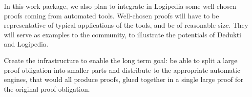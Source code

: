 \begin{workpackage}[id=atpetc,wphases=0-48,type=RTD,
  short=ATPs etc.,%
  title={ATP, SAT, SMT, Model checkers},
  lead=ULi,
  ULiRM=10]
\begin{wpdescription}
In this work package, we also plan to integrate in Logipedia some
well-chosen proofs coming from automated tools.  Well-chosen proofs
will have to be representative of typical applications of the tools,
and be of reasonable size.  They will serve as examples to the
community, to illustrate the potentials of Dedukti and Logipedia.


Create the infrastructure to enable the long term goal: be able to split a large proof
obligation into smaller parts and distribute to the appropriate automatic engines, that
would all produce proofs, glued together in a single large proof for the original proof
obligation.
\end{wpdescription}

\begin{tasklist}
  \begin{task}[id=tools,title=Automatic Tools Exporting Proofs]
  \end{task}

  \begin{task}[id=challenges,title=Logipedia as a Source of Challenges for Automatic Reasoners]
  \end{task}
  \begin{task}[id=commang,title=Cooperation of Reasoners via Dedukti/Logipedia]

    
  \end{task}
  \begin{task}[id=database,title=A Database of Theorems for Automatic Solvers]


\end{task}
\end{tasklist}
\end{workpackage}
